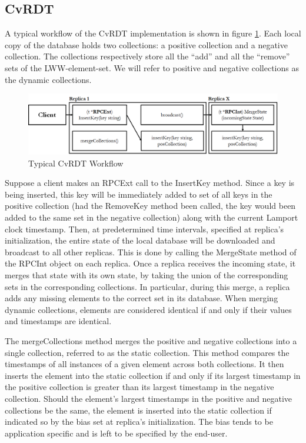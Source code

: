 \documentclass[sigconf,nonacm,11pt]{acmart}
\begin{document}
\subsection{CvRDT}
A typical workflow of the CvRDT implementation is shown in figure \ref{fig:cvrdt1}. Each local copy of the database holds two collections: a positive collection and a negative collection. The collections respectively store all the ``add'' and all the ``remove'' sets of the LWW-element-set. We will refer to positive and negative collections as the dynamic collections. 

\begin{figure}[h]
  \centering
  \includegraphics[width=15cm]{Fig2CvRDT1}
  \caption{Typical CvRDT Workflow}
  \label{fig:cvrdt1}
\end{figure}

Suppose a client makes an RPCExt call to the InsertKey method. Since a key is being inserted, this key will be immediately added to set of all keys in the positive collection (had the RemoveKey method been called, the key would been added to the same set in the negative collection) along with the current Lamport clock timestamp. Then, at predetermined time intervals, specified at replica's initialization, the entire state of the local database will be downloaded and broadcast to all other replicas. This is done by calling the MergeState method of the RPCInt object on each replica. Once a replica receives the incoming state, it merges that state with its own state, by taking the union of the corresponding sets in the corresponding collections. In particular, during this merge, a replica adds any missing elements to the correct set in its database. When merging dynamic collections, elements are considered identical if and only if their values and timestamps are identical.

The mergeCollections method merges the positive and negative collections into a single collection, referred to as the static collection. This method compares the timestamps of all instances of a given element across both collections. It then inserts the element into the static collection if and only if its largest timestamp in the positive collection is greater than its largest timestamp in the negative collection. Should the element's largest timestamps in the positive and negative collections be the same, the element is inserted into the static collection if indicated so by the bias set at replica's initialization. The bias tends to be application specific and is left to be specified by the end-user.
\end{document}
